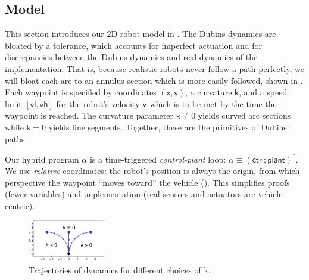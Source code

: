 \documentclass[12pt]{cmuthesis}
\theoremstyle{definition}
\theoremstyle{remark}
\newcommand{\xgvar}{\textsf{x}}
\newcommand{\ygvar}{\textsf{y}}
\newcommand{\kvar}{\textsf{k}}
\newcommand{\vlvar}{\textsf{vl}}
\newcommand{\vhvar}{\textsf{vh}}
\newcommand{\vvar}{{\sf v}\xspace}
\newcommand{\ctrl}{\textsf{ctrl}\xspace}
\newcommand{\plant}{\textsf{plant}\xspace}
\newcommand{\rref}[2][]{\prettyref{#2}}
\begin{document}
\subsection{Model}
\label{sec:planar-driving-system}
This section introduces our 2D robot model in \dL.
The Dubins dynamics are bloated by a tolerance, which accounts for imperfect actuation and for discrepancies between the Dubins dynamics and real dynamics of the implementation.
That is, because realistic robots never follow a path perfectly, we will bloat each arc to an annulus section which is more easily followed, shown in \rref{fig:ode1}.
Each waypoint is specified by coordinates $(\xgvar,\ygvar)$, a curvature $\kvar$, and a speed limit $[\vlvar,\vhvar]$ for the robot's velocity $\vvar$ which is to be met by the time the waypoint is reached.
The curvature parameter $\kvar \neq 0 $ yields curved arc sections while $\kvar=0$ yields line segments.
Together, these are the primitives of Dubins paths.

Our hybrid program $\alpha$ is a time-triggered \emph{control-plant} loop: $\alpha\equiv(\ctrl;\plant)^*$.
We use \emph{relative} coordinates: the robot's position is always the origin, from which perspective the waypoint ``moves toward'' the vehicle (\rref{fig:ode1}).
This simplifies proofs (fewer variables) and implementation (real sensors and actuators are vehicle-centric).
\begin{figure}[h!tb]
\centering
\includegraphics[width=0.3\textwidth]{graphics/fig-ode1.pdf}
\caption{Trajectories of dynamics for different choices of \kvar.}
\label{fig:ode1}
\end{figure}
\end{document}

